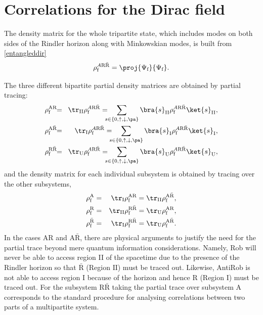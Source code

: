 \section{Correlations for the Dirac field}\label{sec4m4}

The density matrix for the whole tripartite state, which includes modes on both sides of the Rindler horizon along with Minkowskian modes, is built from \eqref{entangleddir}
\begin{equation}\label{tripadir}
\rho^{A\text{R}{\bar{\text{R}}}}_\text{f}=\proj{\Psi_\text{f}}{\Psi_\text{f}}.
\end{equation}

The three different bipartite partial density matrices are obtained by partial tracing:
\begin{eqnarray}
\label{AR2}\rho^\text{AR}_\text{f}&\!\!=\!&\tr_{\text{II}}\rho^{A\text{R}{\bar{\text{R}}}}_\text{f}=\!\!\!\!\sum_{s\in\{0,\uparrow,\downarrow,\pa\}} \bra{s}_{\text{II}}\rho_\text{f}^{A\text{R}{\bar{\text{R}}}}\ket{s}_{\text{II}},\\*
\label{AAR2}\rho^{\text{A}{\bar{\text{R}}}}_\text{f}&\!\!=\!&\tr_\text{I}\rho^{A\text{R}{\bar{\text{R}}}}_\text{f}=\!\!\!\!\sum_{s\in\{0,\uparrow,\downarrow,\pa\}} \bra{s}_\text{I}\rho_\text{f}^{A\text{R}{\bar{\text{R}}}}\ket{s}_\text{I},\\*
\label{RAR2}\rho^{\text{R}{\bar{\text{R}}}}_\text{f}&\!\!=\!&\tr_\text{U}\rho^{A\text{R}{\bar{\text{R}}}}_\text{f}=\!\!\!\!\sum_{s\in\{0,\uparrow,\downarrow,\pa\}} \bra{s}_\text{U}\rho_\text{f}^{A\text{R}{\bar{\text{R}}}}\ket{s}_\text{U},
\end{eqnarray}
and the density matrix for each individual subsystem is obtained by tracing over the other subsystems,
 \begin{eqnarray}
\label{A2}\rho^{\text{A}}_\text{f}&=&\tr_\text{I}\rho^\text{AR}_\text{f}=\tr_{\text{II}}\rho^{\text{A}{\bar{\text{R}}}}_\text{f},\\*
\label{R2}\rho^{\text{R}}_\text{f}&=&\tr_{\text{II}}\rho^{\text{R}{\bar{\text{R}}}}_\text{f}=\tr_\text{U}\rho^\text{AR}_\text{f},\\*
\label{aR2}\rho^{{\bar{\text{R}}}}_\text{f}&=&\tr_\text{I}\rho^{\text{R}{\bar{\text{R}}}}_\text{f}=\tr_\text{U}\rho^{\text{A}{\bar{\text{R}}}}_\text{f}.
\end{eqnarray}
In the cases AR and $\text{A}\bar{\text{R}}$, there are physical
arguments to justify the need for the partial trace beyond mere
quantum information considerations. Namely, Rob will never be  able to
access region II of the spacetime due to the presence of the Rindler
horizon so that $\bar{\text{R}}$ (Region $\text{II}$) must be traced
out. Likewise, AntiRob is not able to access region I  because of the
horizon and hence R (Region I) must be traced out. For the subsystem
${\text{R}\bar{\text{R}}}$ taking the partial trace over subsystem A corresponds
to the standard procedure for analysing correlations between two parts
of a multipartite system. 


